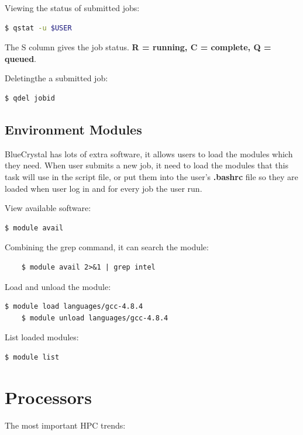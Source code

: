 \documentclass{article}
\begin{document}
Viewing the status of submitted jobs:

\begin{lstlisting}[language=Bash]
    $ qstat -u $USER
\end{lstlisting}

\noindent The S column gives the job status. \textbf{R = running, C = complete, Q = queued}.

Deletingthe a submitted job:

\begin{lstlisting}[language=Bash]
    $ qdel jobid
\end{lstlisting}


\subsection{Environment Modules}

BlueCrystal has lots of extra software, it allows users to load the modules which they need. When user submits a new job, it need to load the modules that this task will use in the script file, or put them into the user's \textbf{.bashrc} file so they are loaded when user log in and for every job the user run.

View available software:

\begin{lstlisting}[language=Bash]
    $ module avail
\end{lstlisting}

Combining the grep command, it can search the module:

\begin{lstlisting}
    $ module avail 2>&1 | grep intel
\end{lstlisting}


Load and unload the module:

\begin{lstlisting}[language=Bash]
    $ module load languages/gcc-4.8.4
    $ module unload languages/gcc-4.8.4
\end{lstlisting}

List loaded modules:

\begin{lstlisting}[language=Bash]
    $ module list
\end{lstlisting}


\section{Processors}

The most important HPC trends:
\end{document}
